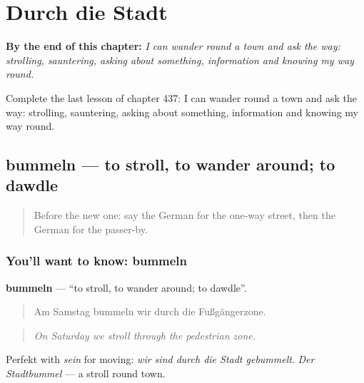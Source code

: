 
\chapter{Durch die Stadt}
\label{ch:ge-durch-die-stadt}

\begin{chapteropening}
\textbf{By the end of this chapter:} \emph{I can wander round a town and ask the way: strolling, sauntering, asking about something, information and knowing my way round.}

Complete the last lesson of chapter 437: I can wander round a town and ask the way: strolling, sauntering, asking about something, information and knowing my way round.
\end{chapteropening}

\section[bummeln]{bummeln — to stroll, to wander around; to dawdle}

\label{lesson:GE-C437-bummeln}



\begin{quote}
Before the new one: say the German for the one-way street, then the German for the passer-by.
\end{quote}

\subsection*{You'll want to know: bummeln}
\textbf{bummeln} — \textquotedblleft{}to stroll, to wander around; to dawdle\textquotedblright{}.

\begin{quote}
Am Samstag bummeln wir durch die Fußgängerzone.
\end{quote}

\begin{quote}
\emph{On Saturday we stroll through the pedestrian zone.}
\end{quote}

Perfekt with \emph{sein} for moving: \emph{wir sind durch die Stadt gebummelt}. \emph{Der Stadtbummel} — a stroll round town.

